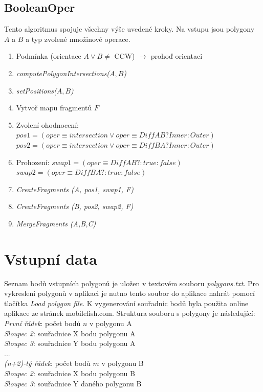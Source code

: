 \documentclass[a4paper, 12pt]{article}
\begin{document}
\subsection{BooleanOper}
Tento algoritmus spojuje všechny výše uvedené kroky. Na vstupu jsou polygony $A$ a $B$ a typ zvolené množinové operace.
\begin{enumerate}
\item Podmínka (orientace $A \lor B \neq$ CCW) $\rightarrow$ prohoď orientaci
\item \textit{computePolygonIntersections($A,B$)}
\item \textit{setPositions($A,B$)}
\item Vytvoř mapu fragmentů $F$
\item Zvolení ohodnocení: $pos1 = (oper \equiv intersection \lor oper \equiv DiffAB?Inner:Outer)$
\subitem \hspace {2.8cm} $pos2 = (oper \equiv intersection \lor oper \equiv DiffBA?Inner:Outer)$
\item Prohození: $swap1 = (oper \equiv DiffAB? : true : false)$
\subitem \hspace {1.2cm} $swap2 = (oper \equiv DiffBA? : true : false)$
\item \textit{CreateFragments (A, pos1, swap1, F)}
\item[] \textit{CreateFragments (B, pos2, swap2, F)}
\item \textit{MergeFragments (A,B,C)}

\end{enumerate}


\section{Vstupní data}
Seznam bodů vstupních polygonů je uložen v textovém souboru \textit{polygons.txt}. Pro vykreslení polygonů v aplikaci je nutno tento soubor do aplikace nahrát pomocí tlačítka \textsl{Load polygon file}. K vygenerování souřadnic bodů byla použita online aplikace ze stránek mobilefish.com. Struktura souboru s polygony je následující:\\

\noindent
\textsl{První řádek}: počet bodů $n$ v polygonu A\\
\textsl{Sloupec 2}: souřadnice X bodu polygonu A\\
\textsl{Sloupec 3}: souřadnice Y bodu polygonu A\\
...\\
\textsl{(n+2)-tý řádek}: počet bodů $m$ v polygonu B\\
\textsl{Sloupec 2}: souřadnice X bodu polygonu B\\
\textsl{Sloupec 3}: souřadnice Y daného polygonu B\\
\end{document}
